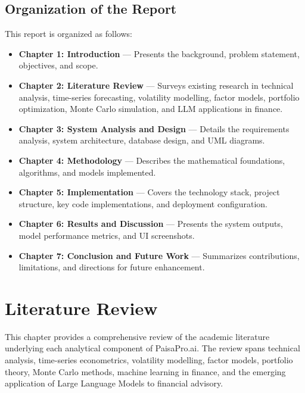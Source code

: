 \documentclass[12pt, a4paper, oneside]{report}
\newcommand{\projectname}{PaisaPro.ai}
\begin{document}
\section{Organization of the Report}
\label{sec:organization}

This report is organized as follows:

\begin{itemize}[nosep]
    \item \textbf{Chapter 1: Introduction} --- Presents the background, problem statement, objectives, and scope.
    \item \textbf{Chapter 2: Literature Review} --- Surveys existing research in technical analysis, time-series forecasting, volatility modelling, factor models, portfolio optimization, Monte Carlo simulation, and LLM applications in finance.
    \item \textbf{Chapter 3: System Analysis and Design} --- Details the requirements analysis, system architecture, database design, and UML diagrams.
    \item \textbf{Chapter 4: Methodology} --- Describes the mathematical foundations, algorithms, and models implemented.
    \item \textbf{Chapter 5: Implementation} --- Covers the technology stack, project structure, key code implementations, and deployment configuration.
    \item \textbf{Chapter 6: Results and Discussion} --- Presents the system outputs, model performance metrics, and UI screenshots.
    \item \textbf{Chapter 7: Conclusion and Future Work} --- Summarizes contributions, limitations, and directions for future enhancement.
\end{itemize}


\chapter{Literature Review}
\label{chap:literature}

This chapter provides a comprehensive review of the academic literature underlying each analytical component of \projectname{}. The review spans technical analysis, time-series econometrics, volatility modelling, factor models, portfolio theory, Monte Carlo methods, machine learning in finance, and the emerging application of Large Language Models to financial advisory.
\end{document}
